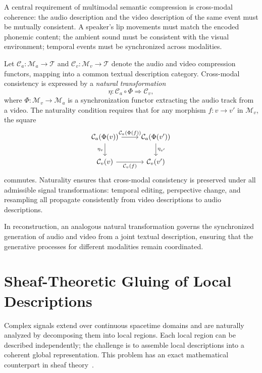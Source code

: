 \documentclass[12pt,a4paper]{article}
\theoremstyle{definition}
\theoremstyle{remark}
\begin{document}
A central requirement of multimodal semantic compression is cross-modal coherence: the audio description and the video description of the same event must be mutually consistent. A speaker's lip movements must match the encoded phonemic content; the ambient sound must be consistent with the visual environment; temporal events must be synchronized across modalities.

Let $\mathcal{C}_a : \mathcal{M}_a \rightarrow \mathcal{T}$ and $\mathcal{C}_v : \mathcal{M}_v \rightarrow \mathcal{T}$ denote the audio and video compression functors, mapping into a common textual description category. Cross-modal consistency is expressed by a \emph{natural transformation}
\[
\eta : \mathcal{C}_a \circ \Phi \Rightarrow \mathcal{C}_v,
\]
where $\Phi : \mathcal{M}_v \rightarrow \mathcal{M}_a$ is a synchronization functor extracting the audio track from a video. The naturality condition requires that for any morphism $f : v \rightarrow v'$ in $\mathcal{M}_v$, the square
\[
\begin{tikzcd}
\mathcal{C}_a(\Phi(v)) \arrow[r, "\mathcal{C}_a(\Phi(f))"] \arrow[d, "\eta_v"'] & \mathcal{C}_a(\Phi(v')) \arrow[d, "\eta_{v'}"] \\
\mathcal{C}_v(v) \arrow[r, "\mathcal{C}_v(f)"'] & \mathcal{C}_v(v')
\end{tikzcd}
\]
commutes. Naturality ensures that cross-modal consistency is preserved under all admissible signal transformations: temporal editing, perspective change, and resampling all propagate consistently from video descriptions to audio descriptions.

In reconstruction, an analogous natural transformation governs the synchronized generation of audio and video from a joint textual description, ensuring that the generative processes for different modalities remain coordinated.

\section{Sheaf-Theoretic Gluing of Local Descriptions}
\label{sec:sheaves}

Complex signals extend over continuous spacetime domains and are naturally analyzed by decomposing them into local regions. Each local region can be described independently; the challenge is to assemble local descriptions into a coherent global representation. This problem has an exact mathematical counterpart in sheaf theory~\cite{jacobs}.
\end{document}
